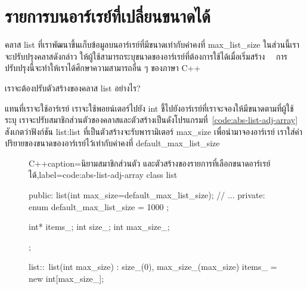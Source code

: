 \section{รายการ{\wbr}บน{\wbr}อาร์เรย์{\wbr}ที่{\wbr}เปลี่ยน{\wbr}ขนาด{\wbr}ได้}
ค{\wbr}ลา{\wbr}ส {\ct list} ที่{\wbr}เรา{\wbr}พัฒนา{\wbr}ขึ้น{\wbr}เก็บ{\wbr}ข้อมูล{\wbr}บน{\wbr}อาร์เรย์{\wbr}ที่{\wbr}มี{\wbr}ขนาด{\wbr}เท่า{\wbr}กับ{\wbr}ค่าคงที่ {\ct
  max\_list\_size} ใน{\wbr}ส่วน{\wbr}นี้{\wbr}เรา{\wbr}จะ{\wbr}ปรับปรุง{\wbr}ค{\wbr}ลา{\wbr}ส{\wbr}ดังกล่าว{\wbr}
ให้{\wbr}ผู้ใช้{\wbr}สามารถ{\wbr}ระบุ{\wbr}ขนาด{\wbr}ของ{\wbr}อาร์เรย์{\wbr}ที่{\wbr}ต้องการ{\wbr}ใช้ได้{\wbr}เมื่อ{\wbr}เริ่ม{\wbr}สร้าง{\wbr}
\ \ การ{\wbr}ปรับปรุง{\wbr}นี้{\wbr}จะ{\wbr}ทำ{\wbr}ให้{\wbr}เรา{\wbr}ได้{\wbr}ศึกษา{\wbr}ความ{\wbr}สามารถ{\wbr}อื่น ๆ ของ{\wbr}ภาษา C++

\begin{quiz}{}
เรา{\wbr}จะ{\wbr}ต้อง{\wbr}ปรับ{\wbr}ตัว{\wbr}สร้าง{\wbr}ของ{\wbr}ค{\wbr}ลา{\wbr}ส list อย่างไร?
\end{quiz}

แทน{\wbr}ที่{\wbr}เรา{\wbr}จะ{\wbr}ใช้{\wbr}อาร์เรย์ เรา{\wbr}จะ{\wbr}ใช้{\wbr}พอยน์เตอร์{\wbr}ไป{\wbr}ยัง {\ct int}
ชี้{\wbr}ไป{\wbr}ยัง{\wbr}อาร์เรย์{\wbr}ที่{\wbr}เรา{\wbr}จะ{\wbr}จอง{\wbr}ให้{\wbr}มี{\wbr}ขนาด{\wbr}ตาม{\wbr}ที่{\wbr}ผู้ใช้{\wbr}ระบุ{\wbr}
เรา{\wbr}จะ{\wbr}ปรับ{\wbr}สมาชิก{\wbr}ส่วนตัว{\wbr}ของ{\wbr}ค{\wbr}ลา{\wbr}ส{\wbr}และ{\wbr}ตัว{\wbr}สร้าง{\wbr}เป็น{\wbr}ดัง{\wbr}โปรแกรม{\wbr}ที่~\ref{code:abs-list-adj-array}
สังเกต{\wbr}ว่า{\wbr}ฟังก์ชัน {\ct list:list} ที่{\wbr}เป็น{\wbr}ตัว{\wbr}สร้าง{\wbr}จะ{\wbr}รับ{\wbr}พารามิเตอร์ {\ct max\_size}
เพื่อ{\wbr}นำมา{\wbr}จอง{\wbr}อาร์เรย์ เรา{\wbr}ใส่{\wbr}ค่า{\wbr}ปริยาย{\wbr}ของ{\wbr}ขนาด{\wbr}ของ{\wbr}อาร์เรย์{\wbr}ไว้{\wbr}เท่า{\wbr}กับ{\wbr}ค่าคงที่ {\ct
  default\_max\_list\_size}

\begin{figure}
\latintext
\begin{codelist}{C++}{caption={\thaitext นิยาม{\wbr}สมาชิก{\wbr}ส่วนตัว และ{\wbr}ตัว{\wbr}สร้าง{\wbr}ของ{\wbr}รายการ{\wbr}ที่{\wbr}เลือก{\wbr}ขนาด{\wbr}อาร์เรย์{\wbr}ได้\latintext},label=code:abs-list-adj-array}
class list {
public:
  list(int max_size=default_max_list_size);
  // ... 
private:
  enum { default_max_list_size = 1000 };

  int* items_;
  int size_;
  int max_size_;
};

list::~list(int max_size)
  : size_(0), max_size_(max_size) 
{
  items_ = new int[max_size_];
}
\end{codelist}
\thaitext
\end{figure}

